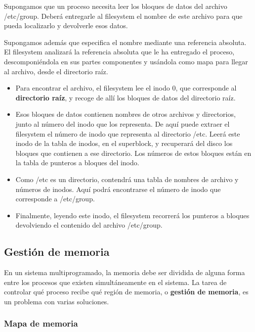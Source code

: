 \documentclass[spanish,A4,]{article}
\begin{document}
Supongamos que un proceso necesita leer los bloques de datos del archivo
/etc/group. Deberá entregarle al filesystem el nombre de este archivo
para que pueda localizarlo y devolverle esos datos.

Supongamos además que especifica el nombre mediante una referencia
absoluta. El filesystem analizará la referencia absoluta que le ha
entregado el proceso, descomponiéndola en sus partes componentes y
usándola como mapa para llegar al archivo, desde el directorio raíz.

\begin{itemize}
\item
  Para encontrar el archivo, el filesystem lee el inodo 0, que
  corresponde al \textbf{directorio raíz}, y recoge de allí los bloques
  de datos del directorio raíz.
\item
  Esos bloques de datos contienen nombres de otros archivos y
  directorios, junto al número del inodo que los representa. De aquí
  puede extraer el filesystem el número de inodo que representa al
  directorio /etc. Leerá este inodo de la tabla de inodos, en el
  superblock, y recuperará del disco los bloques que contienen a ese
  directorio. Los números de estos bloques están en la tabla de punteros
  a bloques del inodo.
\item
  Como /etc es un directorio, contendrá una tabla de nombres de archivo
  y números de inodos. Aquí podrá encontrarse el número de inodo que
  corresponde a /etc/group.
\item
  Finalmente, leyendo este inodo, el filesystem recorrerá los punteros a
  bloques devolviendo el contenido del archivo /etc/group.
\end{itemize}

\subsection{Gestión de memoria}\label{gestiuxf3n-de-memoria}

En un sistema multiprogramado, la memoria debe ser dividida de alguna
forma entre los procesos que existen simultáneamente en el sistema. La
tarea de controlar qué proceso recibe qué región de memoria, o
\textbf{gestión de memoria}, es un problema con varias soluciones.

\subsubsection{Mapa de memoria}\label{mapa-de-memoria}
\end{document}
